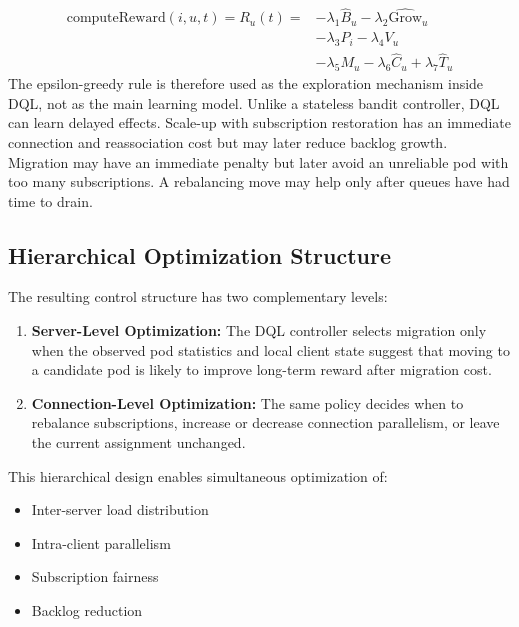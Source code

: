 \documentclass[manuscript]{acmart}
\begin{document}
\begin{align}
	\text{computeReward}(i,u,t)=R_u(t) =
	&-\lambda_1\widehat{B}_u
	-\lambda_2\widehat{\mathrm{Grow}}_u \nonumber\\
	&-\lambda_3 P_i
	-\lambda_4 V_u \nonumber\\
	&-\lambda_5 M_u
	-\lambda_6\widehat{C}_u
	+\lambda_7\widehat{T}_u
	\label{eq:reward_function}
\end{align}
The epsilon-greedy rule is therefore used as the exploration mechanism inside
DQL, not as the main learning model. Unlike a stateless bandit controller, DQL
can learn delayed effects. Scale-up with subscription restoration has an
immediate connection and reassociation cost but may later reduce backlog growth.
Migration may have an immediate penalty but later avoid an unreliable pod with
too many subscriptions. A rebalancing move may help only after queues have had
time to drain.



\subsection{Hierarchical Optimization Structure}

The resulting control structure has two complementary levels:

\begin{enumerate}
	
	\item \textbf{Server-Level Optimization:}
	The DQL controller selects migration only when the observed pod statistics
	and local client state suggest that moving to a candidate pod is likely to
	improve long-term reward after migration cost.
	
	\item \textbf{Connection-Level Optimization:}
	The same policy decides when to rebalance subscriptions, increase or
	decrease connection parallelism, or leave the current assignment unchanged.
	
\end{enumerate}

This hierarchical design enables simultaneous optimization of:

\begin{itemize}
	\item Inter-server load distribution
	\item Intra-client parallelism
	\item Subscription fairness
	\item Backlog reduction
\end{itemize}
\end{document}
